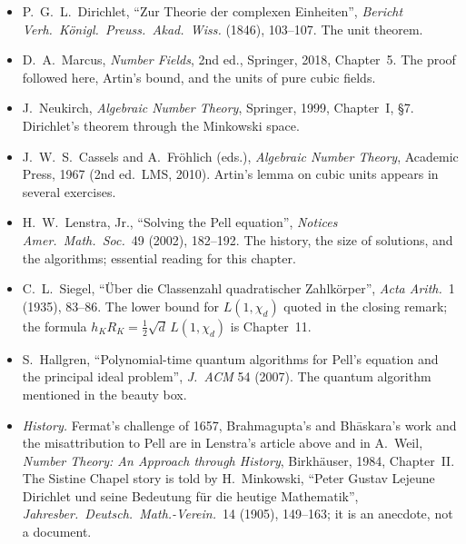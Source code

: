 \begin{itemize}
\item P.~G.~L.~Dirichlet, ``Zur Theorie der complexen Einheiten'', \emph{Bericht Verh.\ K\"onigl.\ Preuss.\ Akad.\ Wiss.}
(1846), 103--107. The unit theorem.
\item D.~A.~Marcus, \emph{Number Fields}, 2nd ed., Springer, 2018, Chapter~5. The proof followed here, Artin's bound, and the
units of pure cubic fields.
\item J.~Neukirch, \emph{Algebraic Number Theory}, Springer, 1999, Chapter~I, \S7. Dirichlet's theorem through the
Minkowski space.
\item J.~W.~S.~Cassels and A.~Fr\"ohlich (eds.), \emph{Algebraic Number Theory}, Academic Press, 1967 (2nd ed.\ LMS, 2010).
Artin's lemma on cubic units appears in several exercises.
\item H.~W.~Lenstra, Jr., ``Solving the Pell equation'', \emph{Notices Amer.\ Math.\ Soc.}\ 49 (2002), 182--192. The history,
the size of solutions, and the algorithms; essential reading for this chapter.
\item C.~L.~Siegel, ``\"Uber die Classenzahl quadratischer Zahlk\"orper'', \emph{Acta Arith.}\ 1 (1935), 83--86. The lower bound for $L(1,\chi_d)$ quoted in the closing remark; the formula
$h_KR_K=\frac12\sqrt d\,L(1,\chi_d)$ is Chapter~11.
\item S.~Hallgren, ``Polynomial-time quantum algorithms for Pell's equation and the principal ideal problem'', \emph{J.\ ACM}
54 (2007). The quantum algorithm mentioned in the beauty box.
\item \emph{History.} Fermat's challenge of 1657, Brahmagupta's and Bh\=askara's work and the misattribution to Pell are
in Lenstra's article above and in A.~Weil, \emph{Number Theory: An Approach through History}, Birkh\"auser, 1984, Chapter~II.
The Sistine Chapel story is told by H.~Minkowski, ``Peter Gustav Lejeune Dirichlet und seine Bedeutung f\"ur die heutige
Mathematik'', \emph{Jahresber.\ Deutsch.\ Math.-Verein.}\ 14 (1905), 149--163; it is an anecdote, not a document.
\end{itemize}
